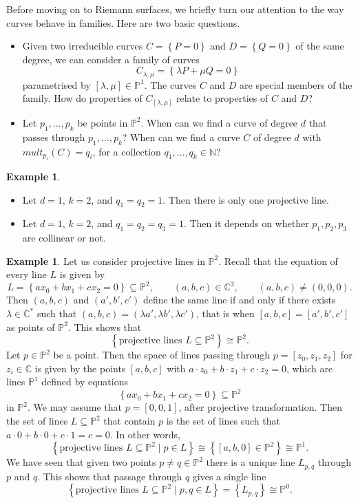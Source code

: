 \documentclass{article}
\newcommand{\N}{\mathbb{N}}
\newcommand{\C}{\mathbb{C}}
\renewcommand{\P}{\mathbb{P}}
\newcommand{\rb}[1]{\left( #1 \right)}
\renewcommand{\sb}[1]{\left[ #1 \right]}
\newcommand{\cb}[1]{\left\{ #1 \right\}}
\theoremstyle{definition}\newtheorem{definition}{Definition}[section]
\theoremstyle{definition}\newtheorem{notation}[definition]{Notation}
\theoremstyle{definition}\newtheorem{remark}[definition]{Remark}
\theoremstyle{definition}\newtheorem{example1}[definition]{Example}
\theoremstyle{definition}\newtheorem{fact}{Fact}
\theoremstyle{definition}\newtheorem{exercise}{Exercise}
\theoremstyle{definition}\newtheorem*{example2}{Example}
\begin{document}
Before moving on to Riemann surfaces, we briefly turn our attention to the way curves behave in families. Here are two basic questions.
\begin{itemize}
\item Given two irreducible curves $ C = \cb{P = 0} $ and $ D = \cb{Q = 0} $ of the same degree, we can consider a family of curves
$$ C_{\lambda, \mu} = \cb{\lambda P + \mu Q = 0} $$
parametrised by $ \sb{\lambda, \mu} \in \P^1 $. The curves $ C $ and $ D $ are special members of the family. How do properties of $ C_{\sb{\lambda, \mu}} $ relate to properties of $ C $ and $ D $?
\item Let $ p_1, \dots, p_k $ be points in $ \P^2 $. When can we find a curve of degree $ d $ that passes through $ p_1, \dots, p_k $? When can we find a curve $ C $ of degree $ d $ with $ mult_{p_i}\rb{C} = q_i $, for a collection $ q_1, \dots, q_k \in \N $?
\end{itemize}

\begin{example2}
\hfill
\begin{itemize}
\item Let $ d = 1 $, $ k = 2 $, and $ q_1 = q_2 = 1 $. Then there is only one projective line.
\item Let $ d = 1 $, $ k = 2 $, and $ q_1 = q_2 = q_3 = 1 $. Then it depends on whether $ p_1, p_2, p_3 $ are collinear or not.
\end{itemize}
\end{example2}

\begin{example1}
Let us consider projective lines in $ \P^2 $. Recall that the equation of every line $ L $ is given by
$$ L = \cb{ax_0 + bx_1 + cx_2 = 0} \subseteq \P^2, \qquad \rb{a, b, c} \in \C^3, \qquad \rb{a, b, c} \ne \rb{0, 0, 0}. $$
Then $ \rb{a, b, c} $ and $ \rb{a', b', c'} $ define the same line if and only if there exists $ \lambda \in \C^* $ such that $ \rb{a, b, c} = \rb{\lambda a', \lambda b', \lambda c'} $, that is when $ \sb{a, b, c} = \sb{a', b', c'} $ as points of $ \P^2 $. This shows that
$$ \cb{\text{projective lines } L \subseteq \P^2} \cong \P^2. $$
Let $ p \in \P^2 $ be a point. Then the space of lines passing through $ p = \sb{z_0, z_1, z_2} $ for $ z_i \in \C $ is given by the points $ \sb{a, b, c} $ with $ a \cdot z_0 + b \cdot z_1 + c \cdot z_2 = 0 $, which are lines $ \P^1 $ defined by equations
$$ \cb{ax_0 + bx_1 + cx_2 = 0} \subseteq \P^2 $$
in $ \P^2 $. We may assume that $ p = \sb{0, 0, 1} $, after projective transformation. Then the set of lines $ L \subseteq \P^2 $ that contain $ p $ is the set of lines such that $ a \cdot 0 + b \cdot 0 + c \cdot 1 = c = 0 $. In other words,
$$ \cb{\text{projective lines } L \subseteq \P^2 \mid p \in L} \cong \cb{\sb{a, b, 0} \in \P^2} \cong \P^1. $$
We have seen that given two points $ p \ne q \in \P^2 $ there is a unique line $ L_{p, q} $ through $ p $ and $ q $. This shows that passage through $ q $ gives a single line
$$ \cb{\text{projective lines } L \subseteq \P^2 \mid p, q \in L} = \cb{L_{p, q}} \cong \P^0. $$
\end{example1}
\end{document}
